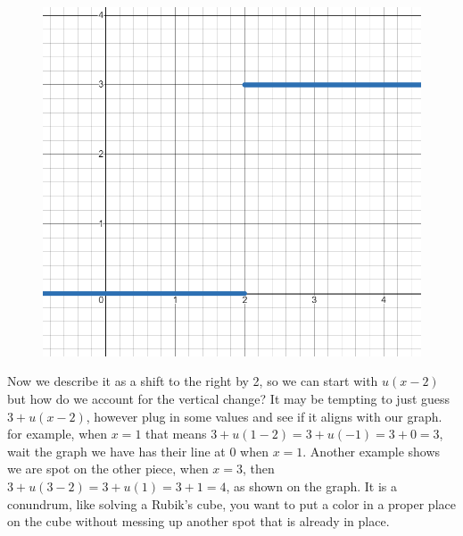 \documentclass[12pt]{article}
\begin{document}
\begin{figure}[!htbp]
\centering
\includegraphics[scale=.4]{step2.PNG}
\label{fig:hsf2}
\end{figure}

Now we describe it as a shift to the right by 2, so we can start with $u(x-2)$ but how do we account for the vertical change? It may be tempting to just guess $3+u(x-2)$, however plug in some values and see if it aligns with our graph. for example, when $x=1$ that means $3+u(1-2)=3+u(-1)=3+0=3$, wait the graph we have has their line at $0$ when $x=1$. Another example shows we are spot on the other piece, when $x=3$, then $3+u(3-2)=3+u(1)=3+1=4$, as shown on the graph. It is a conundrum, like solving a Rubik's cube, you want to put a color in a proper place on the cube without messing up another spot that is already in place. \\
\end{document}
